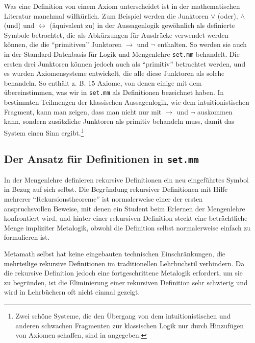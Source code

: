 Was eine Definition von einem Axiom unterscheidet ist in der mathe\-ma\-tischen Literatur manchmal willkürlich.  Zum Beispiel werden die Junktoren $\vee$ ({\sc oder}), $\wedge$ ({\sc und}) und $\leftrightarrow$ (äquivalent zu) in der Aussagenlogik gewöhnlich als definierte Symbole betrachtet, die als Abkürzungen für Ausdrücke verwendet werden können, die die "`primitiven"' Junktoren $\rightarrow$ und $\neg$ enthalten.  So werden sie auch in der Standard-Datenbasis für Logik und Mengenlehre \texttt{set.mm} behandelt.  Die ersten drei Junktoren können jedoch auch als "`primitiv"' betrachtet werden, und es wurden Axiomensysteme entwickelt, die alle diese Junktoren als solche behandeln.  So enthält z. B. \cite[S.~35]{Goodstein} 15 Axiome, von denen einige mit dem übereinstimmen, was wir in \texttt{set.mm} als Definitionen bezeichnet haben.  In bestimmten Teilmengen der klassischen Aussagenlogik, wie dem intuitionistischen Fragment, kann man zeigen, dass man nicht nur mit $\rightarrow$ und $\neg$ auskommen kann, sondern zusätzliche Junktoren als primitiv behandeln muss, damit das System einen Sinn ergibt.\footnote{Zwei schöne Systeme, die den Übergang von dem intuitionistischen und anderen schwachen Fragmenten zur klassischen Logik nur durch Hinzufügen von Axiomen schaffen, sind in \cite{Robinsont} angegeben.}

\subsection{Der Ansatz für Definitionen in \texttt{set.mm}}

In der Mengenlehre definieren rekursive Definitionen ein neu eingeführtes Symbol in Bezug auf sich selbst. Die Begründung rekursiver Definitionen mit Hilfe mehrerer "`Rekursionstheoreme"' ist normalerweise einer der ersten anspruchsvollen Beweise, mit denen ein Student beim Erlernen der Mengenlehre konfrontiert wird, und hinter einer rekursiven Definition steckt eine beträchtliche Menge impliziter Metalogik, obwohl die Definition selbst normalerweise einfach zu formulieren ist.

Metamath selbst hat keine eingebauten technischen Einschränkungen, die mehrteilige rekursive Definitionen im traditionellen Lehrbuchstil verhindern. Da die rekursive Definition jedoch eine fortgeschrittene Metalogik erfordert, um sie zu begründen, ist die Eliminierung einer rekursiven Definition sehr schwierig und wird in Lehrbüchern oft nicht einmal gezeigt. 

